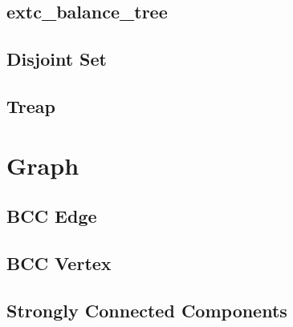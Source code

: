 \documentclass[a4paper,10pt,twocolumn,oneside]{article}
\begin{document}
\subsection{extc\_balance\_tree}


\subsection{Disjoint Set}


\subsection{Treap}


%

%

\section{Graph}

\subsection{BCC Edge}


\subsection{BCC Vertex}


\subsection{Strongly Connected Components}

\end{document}
